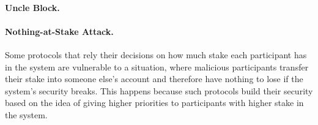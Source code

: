 \documentclass[11pt]{article}
\theoremstyle{mytheoremstyle}
\begin{document}
\paragraph{Uncle Block.} 

\paragraph{Nothing-at-Stake Attack.} Some protocols that rely their decisions on how much stake each participant has in the system are vulnerable to a situation, where malicious participants transfer their stake into someone else's account and therefore have nothing to lose if the system's security breaks. This happens because such protocols build their security based on the idea of giving higher priorities to participants with higher stake in the system.


\end{document}
